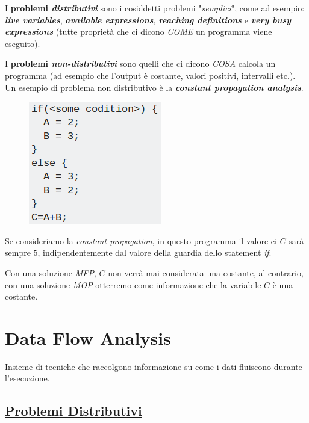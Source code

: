 \documentclass[a4paper, 11pt]{report}
\begin{document}
I \textbf{problemi \textit{distributivi}} sono i cosiddetti problemi "\textit{semplici}", come ad esempio: \textit{\textbf{live variables}}, \textit{\textbf{available expressions}}, \textit{\textbf{reaching definitions}} e \textit{\textbf{very busy expressions}} (tutte proprietà che ci dicono \textit{COME} un programma viene eseguito).

I \textbf{problemi \textit{non-distributivi}} sono quelli che ci dicono \textit{COSA} calcola un programma (ad esempio che l'output è costante, valori positivi, intervalli etc.). Un esempio di problema non distributivo è la \textit{\textbf{constant propagation analysis}}.

\begin{multicols}{2}	
	\begin{figure}[H]
		\centering
		\includegraphics[scale=0.55]{MOPMFP}
	\end{figure}
	\columnbreak
	Se consideriamo la \textit{constant propagation}, in questo programma il valore ci $C$ sarà sempre $5$, indipendentemente dal valore della guardia dello statement \textit{if}.
	
	Con una soluzione \textit{MFP}, $C$ non verrà mai considerata una costante, al contrario, con una soluzione \textit{MOP} otterremo come informazione che la variabile $C$ è una costante.
\end{multicols}

\newpage
\section*{Data Flow Analysis}
Insieme di tecniche che raccolgono informazione su come i dati fluiscono durante l'esecuzione.

\subsection*{\underline{Problemi Distributivi}}
\end{document}
